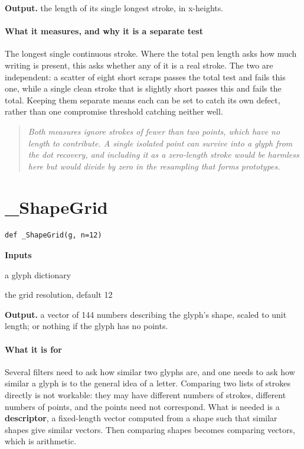 \noindent\textbf{Output.} the length of its single longest stroke, in x-heights.


\paragraph{What it measures, and why it is a separate test}
The longest single continuous stroke. Where the total pen length asks how much writing is present, this asks whether any of it is a real stroke. The two are independent: a scatter of eight short scraps passes the total test and fails this one, while a single clean stroke that is slightly short passes this and fails the total. Keeping them separate means each can be set to catch its own defect, rather than one compromise threshold catching neither well.


\begin{quote}\small\itshape Both measures ignore strokes of fewer than two points, which have no length to contribute. A single isolated point can survive into a glyph from the dot recovery, and including it as a zero-length stroke would be harmless here but would divide by zero in the resampling that forms prototypes.\end{quote}

\section{\_ShapeGrid}
\begin{lstlisting}[style=sig]
def _ShapeGrid(g, n=12)
\end{lstlisting}

\noindent\textbf{Inputs}
\begin{description}[leftmargin=2.2em,style=nextline,font=\normalfont\ttfamily]\setlength\itemsep{1pt}
  \item[{g}] \normalfont a glyph dictionary
  \item[{n}] \normalfont the grid resolution, default 12
\end{description}

\noindent\textbf{Output.} a vector of 144 numbers describing the glyph's shape, scaled to unit length; or nothing if the glyph has no points.


\paragraph{What it is for}
Several filters need to ask how similar two glyphs are, and one needs to ask how similar a glyph is to the general idea of a letter. Comparing two lists of strokes directly is not workable: they may have different numbers of strokes, different numbers of points, and the points need not correspond. What is needed is a \textbf{descriptor}, a fixed-length vector computed from a shape such that similar shapes give similar vectors. Then comparing shapes becomes comparing vectors, which is arithmetic.


